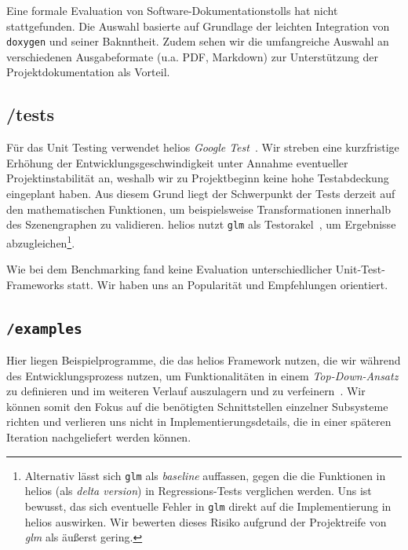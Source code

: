 Eine formale Evaluation von Software-Dokumentationstolls hat nicht stattgefunden.
Die Auswahl basierte auf Grundlage der leichten Integration von \texttt{doxygen} und seiner Baknntheit.
Zudem sehen wir die umfangreiche Auswahl an verschiedenen Ausgabeformate (u.a. PDF, Markdown) zur Unterstützung der Projektdokumentation als Vorteil.


\subsection*{/tests}
\noindent
Für das Unit Testing verwendet helios \textit{Google Test}~\cite[]{googletestgithub}.
Wir streben eine kurzfristige Erhöhung der Entwicklungsgeschwindigkeit unter Annahme eventueller Projektinstabilität an, weshalb wir zu Projektbeginn keine hohe Testabdeckung eingeplant haben.
Aus diesem Grund liegt der Schwerpunkt der Tests derzeit auf den mathematischen Funktionen, um beispielsweise Transformationen innerhalb des Szenengraphen zu validieren. helios nutzt \texttt{glm} als Testorakel~\cite[917 ff.]{Bin99}, um Ergebnisse abzugleichen\footnote{
    Alternativ lässt sich \texttt{glm} als \textit{baseline} auffassen, gegen die die Funktionen in helios (als \textit{delta version}) in Regressions-Tests verglichen werden. Uns ist bewusst, das sich eventuelle Fehler in \texttt{glm} direkt auf die Implementierung in helios auswirken. Wir bewerten dieses Risiko aufgrund der Projektreife von \textit{glm} als äußerst gering.
}.


\noindent
Wie bei dem Benchmarking fand keine Evaluation unterschiedlicher Unit-Test-Frameworks statt.
Wir haben uns an Popularität und Empfehlungen orientiert.

\subsection*{\texttt{/examples}}
Hier liegen Beispielprogramme, die das helios Framework nutzen, die wir während des Entwicklungsprozess nutzen, um Funktionalitäten in einem \textit{Top-Down-Ansatz} zu definieren und im weiteren Verlauf auszulagern und zu verfeinern~\cite[]{Wir71}.
Wir können somit den Fokus auf die benötigten Schnittstellen einzelner Subsysteme richten und verlieren uns nicht in Implementierungsdetails, die in einer späteren Iteration nachgeliefert werden können.

